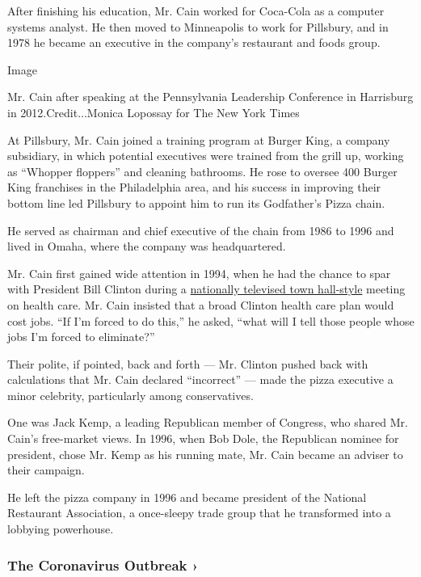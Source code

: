 After finishing his education, Mr. Cain worked for Coca-Cola as a
computer systems analyst. He then moved to Minneapolis to work for
Pillsbury, and in 1978 he became an executive in the company's
restaurant and foods group.

Image

Mr. Cain after speaking at the Pennsylvania Leadership Conference in
Harrisburg in 2012.Credit...Monica Lopossay for The New York Times

At Pillsbury, Mr. Cain joined a training program at Burger King, a
company subsidiary, in which potential executives were trained from the
grill up, working as ``Whopper floppers'' and cleaning bathrooms. He
rose to oversee 400 Burger King franchises in the Philadelphia area, and
his success in improving their bottom line led Pillsbury to appoint him
to run its Godfather's Pizza chain.

He served as chairman and chief executive of the chain from 1986 to 1996
and lived in Omaha, where the company was headquartered.

Mr. Cain first gained wide attention in 1994, when he had the chance to
spar with President Bill Clinton during a
\href{http://www.youtube.com/watch?v=-WP5dYfBBzU}{nationally televised
town hall-style} meeting on health care. Mr. Cain insisted that a broad
Clinton health care plan would cost jobs. ``If I'm forced to do this,''
he asked, ``what will I tell those people whose jobs I'm forced to
eliminate?''

Their polite, if pointed, back and forth --- Mr. Clinton pushed back
with calculations that Mr. Cain declared ``incorrect'' --- made the
pizza executive a minor celebrity, particularly among conservatives.

One was Jack Kemp, a leading Republican member of Congress, who shared
Mr. Cain's free-market views. In 1996, when Bob Dole, the Republican
nominee for president, chose Mr. Kemp as his running mate, Mr. Cain
became an adviser to their campaign.

He left the pizza company in 1996 and became president of the National
Restaurant Association, a once-sleepy trade group that he transformed
into a lobbying powerhouse.

\href{https://www.nytimes.com/news-event/coronavirus?action=click\&pgtype=Article\&state=default\&region=MAIN_CONTENT_3\&context=storylines_faq}{}

\hypertarget{the-coronavirus-outbreak-}{%
\subsubsection{The Coronavirus Outbreak
›}\label{the-coronavirus-outbreak-}}

